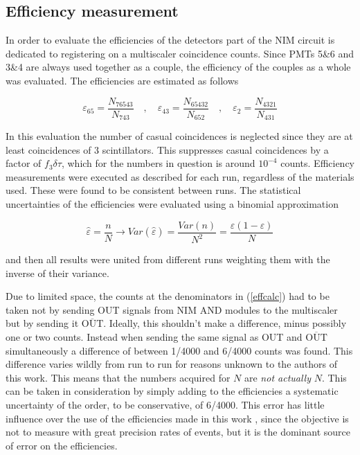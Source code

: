 \documentclass[10pt,a4paper,twocolumn]{article}
\begin{document}
\subsection{Efficiency measurement}

In order to evaluate the efficiencies of the detectors part of the NIM circuit is dedicated to registering on a multiscaler coincidence counts. Since PMTs 5\&6 and 3\&4 are always used together as a couple, the efficiency of the couples as a whole was evaluated. The efficiencies are estimated as follows


\begin{equation}
    \label{effcalc}
    \varepsilon_{65}=\frac{N_{76543}}{N_{743}} \quad , \quad\varepsilon_{43}=\frac{N_{65432}}{N_{652}} \quad , \quad \varepsilon_2=\frac{N_{4321}}{N_{431}}
\end{equation}

\noindent In this evaluation the number of casual coincidences is neglected since they are at least coincidences of 3 scintillators. This suppresses casual coincidences by a factor of $f_3 \delta \tau$, which for the numbers in question is around $10^{-4}$ counts. Efficiency measurements were executed as described for each run, regardless of the materials used. These were found to be consistent between runs.
The statistical uncertainties of the efficiencies were evaluated using a binomial approximation

\begin{equation}
    \hat{\varepsilon}=\frac{n}{N} \longrightarrow Var(\hat{\varepsilon})=\frac{Var(n)}{N^2}=\frac{\varepsilon(1-\varepsilon)}{N}
\end{equation}

and then all results were united from different runs weighting them with the inverse of their variance.

Due to limited space, the counts at the denominators in (\ref{effcalc}) had to be taken not by sending OUT signals from NIM AND modules to the multiscaler but by sending it $\overline{\text{OUT}}$. Ideally, this shouldn't make a difference, minus possibly one or two counts. Instead when sending the same signal as OUT and $\overline{\text{OUT}}$ simultaneously a difference of between 1/4000 and 6/4000 counts was found. This difference varies wildly from run to run for reasons unknown to the authors of this work. This means that the numbers acquired for $N$ are \textit{not actually} $N$. This can be taken in consideration by simply adding to the efficiencies a systematic uncertainty of the order, to be conservative, of 6/4000. This error has little influence over the use of the efficiencies made in this work , since the objective is not to measure with great precision rates of events, but it is the dominant source of error on the efficiencies.
\end{document}
